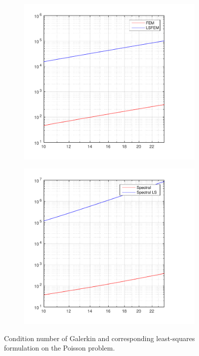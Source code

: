 %
\begin{figure}[h!]
  \centering
  \begin{subfigure}[b]{0.48\textwidth}
	\includegraphics[width=\textwidth]{Figures/condFEM-LSFEM.pdf}
  \end{subfigure}%
  \quad
  \begin{subfigure}[b]{0.48\textwidth}
	\includegraphics[width=\textwidth]{Figures/condSpec-SpecLS.pdf}
  \end{subfigure}
  \vspace{-0.1\baselineskip}
  \caption{Condition number of Galerkin and corresponding least-squares formulation on the Poisson problem.}
  \label{fig:ConditionPoisson}
\end{figure}
%
